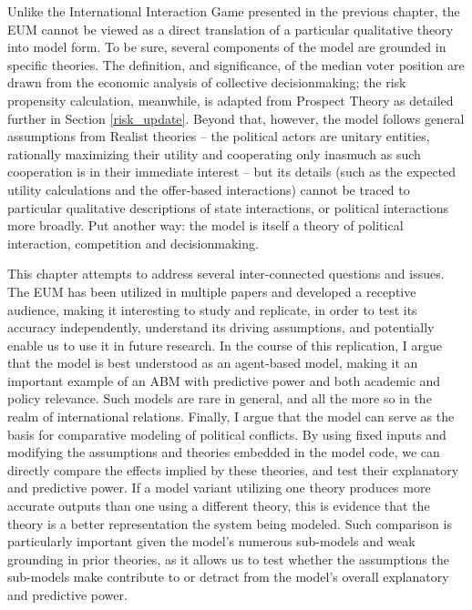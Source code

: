 Unlike the International Interaction Game presented in the previous chapter, the EUM cannot be viewed as a direct translation of a particular qualitative theory into model form. To be sure, several components of the model are grounded in specific theories. The definition, and significance, of the median voter position are drawn from the \citet{black_1948} economic analysis of collective decisionmaking; the risk propensity calculation, meanwhile, is adapted from Prospect Theory \citep{kahneman_1984} as detailed further in Section \ref{risk_update}. Beyond that, however, the model follows general assumptions from Realist theories -- the political actors are unitary entities, rationally maximizing their utility and cooperating only inasmuch as such cooperation is in their immediate interest -- but its details (such as the expected utility calculations and the offer-based interactions) cannot be traced to particular qualitative descriptions of state interactions, or political interactions more broadly. Put another way: the model is itself a theory of political interaction, competition and decisionmaking.

This chapter attempts to address several inter-connected questions and issues. The EUM has been utilized in multiple papers and developed a receptive audience, making it interesting to study and replicate, in order to test its accuracy independently, understand its driving assumptions, and potentially enable us to use it in future research. In the course of this replication, I argue that the model is best understood as an agent-based model, making it an important example of an ABM with predictive power and both academic and policy relevance. Such models are rare in general, and all the more so in the realm of international relations. Finally, I argue that the model can serve as the basis for comparative modeling of political conflicts. By using fixed inputs and modifying the assumptions and theories embedded in the model code, we can directly compare the effects implied by these theories, and test their explanatory and predictive power. If a model variant utilizing one theory produces more accurate outputs than one using a different theory, this is evidence that the theory is a better representation the system being modeled. Such comparison is particularly important given the model's numerous sub-models and weak grounding in prior theories, as it allows us to test whether the assumptions the sub-models make contribute to or detract from the model's overall explanatory and predictive power.

